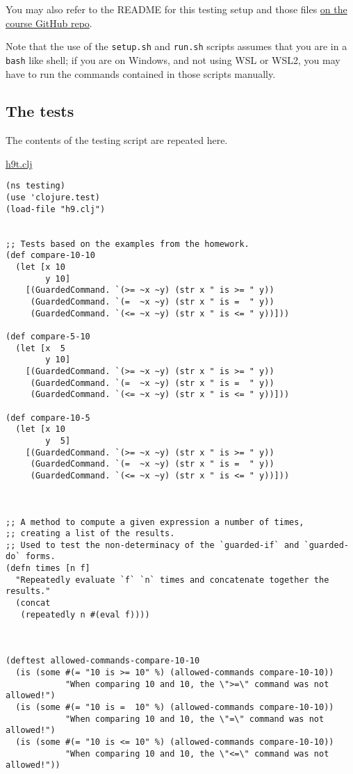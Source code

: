 \documentclass[11pt]{article}
\begin{document}
You may also refer to the README
for this testing setup and those files
\href{https://github.com/armkeh/principles-of-programming-languages/tree/master/homework/testing/h5}{on the course GitHub repo}.

Note that the use of the \texttt{setup.sh} and \texttt{run.sh} scripts assumes
that you are in a \texttt{bash} like shell; if you are on Windows,
and not using WSL or WSL2, you may have
to run the commands contained in those scripts manually.

\subsection*{The tests}
\label{sec:org29695ec}
The contents of the testing script are repeated here.

\href{./testing/h9/h9t.clj}{h9t.clj}
\begin{verbatim}
(ns testing)
(use 'clojure.test)
(load-file "h9.clj")


;; Tests based on the examples from the homework.
(def compare-10-10
  (let [x 10
        y 10]
    [(GuardedCommand. `(>= ~x ~y) (str x " is >= " y))
     (GuardedCommand. `(=  ~x ~y) (str x " is =  " y))
     (GuardedCommand. `(<= ~x ~y) (str x " is <= " y))]))

(def compare-5-10
  (let [x  5
        y 10]
    [(GuardedCommand. `(>= ~x ~y) (str x " is >= " y))
     (GuardedCommand. `(=  ~x ~y) (str x " is =  " y))
     (GuardedCommand. `(<= ~x ~y) (str x " is <= " y))]))

(def compare-10-5
  (let [x 10
        y  5]
    [(GuardedCommand. `(>= ~x ~y) (str x " is >= " y))
     (GuardedCommand. `(=  ~x ~y) (str x " is =  " y))
     (GuardedCommand. `(<= ~x ~y) (str x " is <= " y))]))



;; A method to compute a given expression a number of times,
;; creating a list of the results.
;; Used to test the non-determinacy of the `guarded-if` and `guarded-do` forms.
(defn times [n f]
  "Repeatedly evaluate `f` `n` times and concatenate together the results."
  (concat
   (repeatedly n #(eval f))))



(deftest allowed-commands-compare-10-10
  (is (some #(= "10 is >= 10" %) (allowed-commands compare-10-10))
            "When comparing 10 and 10, the \">=\" command was not allowed!")
  (is (some #(= "10 is =  10" %) (allowed-commands compare-10-10))
            "When comparing 10 and 10, the \"=\" command was not allowed!")
  (is (some #(= "10 is <= 10" %) (allowed-commands compare-10-10))
            "When comparing 10 and 10, the \"<=\" command was not allowed!"))


\end{verbatim}
\end{document}
